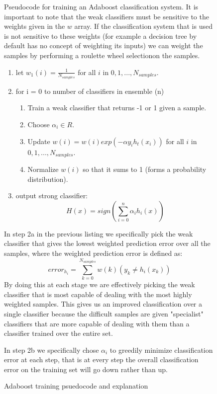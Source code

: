 \documentclass[ %
                    author={Sam Phippen},
                supervisor={Dr. Rafal Bogacz},
                     title={Real time voice activity detectors in noisy personal computing environments},
                  subtitle={},
                    degree={MEng},
                      year={2012} ]{thesis}
\begin{document}
\begin{figure}
    Pseudocode for training an Adaboost classification system. It is important
    to note that the weak classifiers must be sensitive to the weights given in
    the $w$ array. If the classification system that is used is not sensitive
    to these weights (for example a decision tree by default has no concept of
    weighting its inputs) we can weight the samples by performing a roulette
    wheel selection\footnotemark on the samples.

    \vspace{3em}

    \begin{enumerate}

        \item let $w_1(i)=\frac{1}{N_{samples}}$ for all $i$ in
            $0,1,...,N_{samples}$.

        \item for i = 0 to number of classifiers in ensemble (n)
            \begin{enumerate}

                \item Train a weak classifier that returns -1 or 1 given a
                    sample.
                \item Choose $\alpha_i \in R$.
                \item Update $w(i) = w(i)exp(-\alpha y_i h_t(x_i))$ for all $i$ in
            $0,1,...,N_{samples}$.
            \item Normalize $w(i)$ so that it sums to 1 (forms a probability distribution).

            \end{enumerate}
        \item output strong classifier: $$H(x) = sign\left(\sum_{i=0}^{n}\alpha_i h_i(x)\right)$$
    \end{enumerate}

    \vspace{3em}

    In step 2a in the previous listing we specifically pick the weak classifier
    that gives the lowest weighted prediction error over all the samples, where
    the weighted prediction error is defined as: $$error_{h_i} =
    \sum_{k=0}^{N_{samples}} w(k)(y_k\neq h_i(x_k))$$By doing this at each
    stage we are effectively picking the weak classifier that is most capable
    of dealing with the most highly weighted samples. This gives us an improved
    classification over a single classifier because the difficult samples are
    given "specialist" classifiers that are more capable of dealing with them
    than a classifier trained over the entire set.

    In step 2b we specifically chose $\alpha_i$ to greedily minimize
    classification error at each step, that is at every step the overall
    classification error on the training set will go down rather than up.

    \caption{Adaboost training psuedocode and explanation}
    \label{pseudo:adaboost}

\end{figure}
\end{document}
